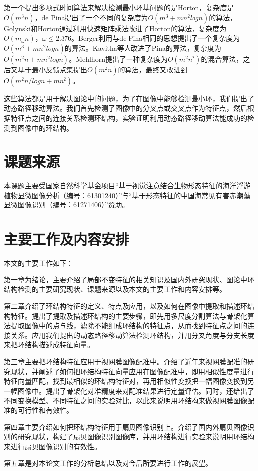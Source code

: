 第一个提出多项式时间算法来解决检测最小环基问题的是Horton\cite{horton}，复杂度是$O(m^3n)$，de Pina\cite{pina}提出了一个不同的复杂度为$O(m^3+mn^2logn)$的算法，Golynski和Horton\cite{golynski}通过利用快速矩阵乘法改进了Horton的算法，复杂度为$O(m_{\omega}n)$，$\omega \le 2.376$。Berger\cite{berger}利用与de Pina相同的思想提出了一个复杂度为$O(m^3+mn^2logn)$的算法。Kavitha\cite{kavitha}等人改进了Pina的算法，复杂度为$O(m^2n+mn^2logn)$。Mehlhorn\cite{mehlhorn}提出了一种复杂度为$O(m^2n^2)$的混合算法，之后又基于最小反馈点集提出$O(m^2n)$的算法，最终又改进到$O(m^2n/logn + mn^2)$。

这些算法都是用于解决图论中的问题，为了在图像中能够检测最小环，我们提出了动态路径移动算法。我们首先检测了图像中的分叉点或交叉点作为特征点，然后根据特征点之间的连接关系检测环结构，实验证明利用动态路径移动算法能成功的检测到图像中的环结构。

\section{课题来源}
\label{sec:theorem}

本课题主要受国家自然科学基金项目“基于视觉注意结合生物形态特征的海洋浮游植物显微图像分析（编号：61301240）”与“基于形态特征的中国海常见有害赤潮藻显微图像识别（编号：61271406）”资助。


\section{主要工作及内容安排}
\label{sec:bib}

本文的主要工作如下：

第一章为绪论，主要介绍了局部不变特征的相关知识及国内外研究现状、图论中环结构检测的主要研究现状、课题来源以及本文的主要工作和内容安排等。

第二章介绍了环结构特征的定义、特点及应用，以及如何在图像中提取和描述环结构特征。提出了提取及描述环结构的主要步骤，即先用多尺度分割算法与骨架化算法提取图像中的点与线，滤除不能组成环结构的特征点，从而找到特征点之间的连接关系。应用我们提出的动态路径移动算法检测环结构，并用分叉角度与分支长度来把环结构描述成特征向量。

第三章主要把环结构特征应用于视网膜图像配准中。介绍了近年来视网膜配准的研究现状，并阐述了如何把环结构特征向量应用在图像配准中，即用相似性度量进行特征向量匹配，找到最相似的环结构特征对，再用相似性变换把一幅图像变换到另一幅图像中。提出了骨架化对准精度来对配准结果进行定量评估。同时，还给出了不同变换模型、不同特征之间的实验对比，以此来说明用环结构来做视网膜图像配准的可行性和有效性。

第四章主要介绍如何把环结构特征用于扇贝图像识别上。介绍了国内外扇贝图像识别的研究现状，构建了扇贝图像识别图像库，并用环结构进行实验来说明用环结构来进行扇贝图像识别的有效性。

第五章是对本论文工作的分析总结以及对今后所要进行工作的展望。
